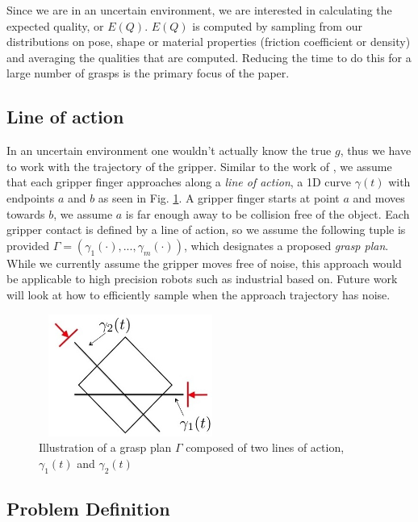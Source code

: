 \documentclass[letterpaper, 10 pt, conference]{ieeeconf}  %
\begin{document}
Since we are in an uncertain environment, we are interested in calculating the expected quality, or $E(Q)$. $E(Q)$ is computed by sampling from our distributions on pose, shape or material properties (friction coefficient or density) and averaging the qualities that are computed. Reducing the time to do this for a large number of grasps is the primary focus of the paper. 

\subsection{Line of action}
In an uncertain environment one wouldn't actually know the true $g$, thus we have to work with the trajectory of the gripper. Similar to the work of \cite{christopoulos2007handling}, we assume that each gripper finger approaches along a \textit{line of action}, a 1D curve $\gamma(t)$ with endpoints $a$ and $b$ as seen in Fig. \ref{fig:line_of_action}.
A gripper finger starts at point $a$ and moves towards $b$, we assume $a$ is far enough away to be collision free of the object.
Each gripper contact is defined by a line of action, so we assume the following tuple is provided $\Gamma = ( \gamma_1(\cdot),...,\gamma_m(\cdot) )$, which designates a proposed \textit{grasp plan}.
While we currently assume the gripper moves free of noise, this approach would be applicable to high precision robots such as industrial based on. 
Future work will look at how to efficiently sample when the approach trajectory has noise. 

\begin{figure}[ht!]
\centering
\includegraphics[width = 6cm, height = 4cm]{figures/Slide01.jpg}
\caption{Illustration of a grasp plan $\Gamma$ composed of two lines of action, $\gamma_1(t)$ and $\gamma_2(t)$}
\vspace*{-10pt}
\label{fig:line_of_action}
\end{figure}

\subsection{Problem Definition}
\end{document}
